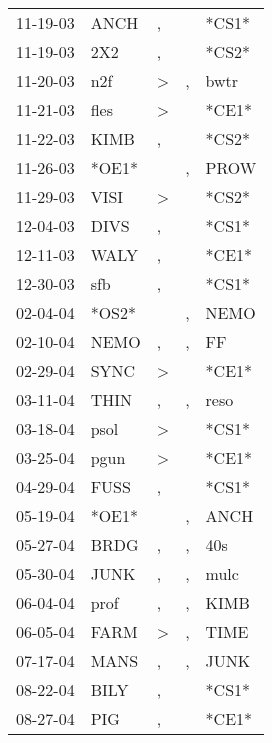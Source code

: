 \begin{supertabular}{lllll}
 11-19-03 &   ANCH &             , &               &  *CS1* \\
 11-19-03 &    2X2 &             , &               &  *CS2* \\
 11-20-03 &    n2f &  \textgreater &             , &   bwtr \\
 11-21-03 &   fles &  \textgreater &               &  *CE1* \\
 11-22-03 &   KIMB &             , &               &  *CS2* \\
 11-26-03 &  *OE1* &               &             , &   PROW \\
 11-29-03 &   VISI &  \textgreater &               &  *CS2* \\
 12-04-03 &   DIVS &             , &               &  *CS1* \\
 12-11-03 &   WALY &             , &               &  *CE1* \\
 12-30-03 &    sfb &             , &               &  *CS1* \\
 02-04-04 &  *OS2* &               &             , &   NEMO \\
 02-10-04 &   NEMO &             , &             , &     FF \\
 02-29-04 &   SYNC &  \textgreater &               &  *CE1* \\
 03-11-04 &   THIN &             , &             , &   reso \\
 03-18-04 &   psol &  \textgreater &               &  *CS1* \\
 03-25-04 &   pgun &  \textgreater &               &  *CE1* \\
 04-29-04 &   FUSS &             , &               &  *CS1* \\
 05-19-04 &  *OE1* &               &             , &   ANCH \\
 05-27-04 &   BRDG &             , &             , &    40s \\
 05-30-04 &   JUNK &             , &             , &   mulc \\
 06-04-04 &   prof &             , &             , &   KIMB \\
 06-05-04 &   FARM &  \textgreater &             , &   TIME \\
 07-17-04 &   MANS &             , &             , &   JUNK \\
 08-22-04 &   BILY &             , &               &  *CS1* \\
 08-27-04 &    PIG &             , &               &  *CE1* \\

\end{supertabular}
